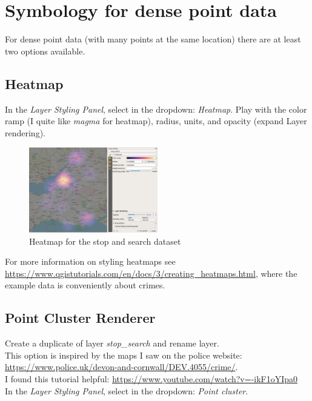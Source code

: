 \section{Symbology for dense point data}

For dense point data (with many points at the same location) there are at least two options available.

\subsection{Heatmap}
In the \textit{Layer Styling Panel}, select in the dropdown: \textit{Heatmap}.
Play with the color ramp (I quite like \textit{magma} for heatmap), radius, units, and opacity (expand Layer rendering).

\begin{figure}[!h]
	\centering
	\includegraphics[width=0.5\textwidth]{images/heatmap3.png}
	\caption{Heatmap for the stop and search dataset}
	\label{ft_fig_firstfig3}
\end{figure}

For more information on styling heatmaps see \url{https://www.qgistutorials.com/en/docs/3/creating_heatmaps.html}, where the example data is conveniently about crimes.

\subsection{Point Cluster Renderer}

Create a duplicate of layer \textit{stop\_search} and rename layer.\\
This option is inspired by the maps I saw on the police website:\\ \url{https://www.police.uk/devon-and-cornwall/DEV.4055/crime/}.\\
I found this tutorial helpful: \url{https://www.youtube.com/watch?v=-ikF1oYIpa0}\\

In the \textit{Layer Styling Panel}, select in the dropdown: \textit{Point cluster}.\\

